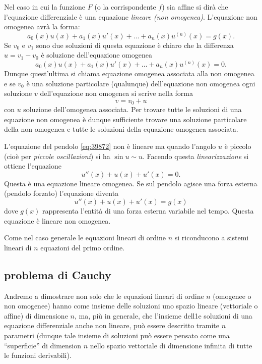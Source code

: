 Nel caso in cui la funzione $F$ (o la corrispondente $f$)
sia affine 
si dirà che l'equazione differenziale
è una equazione
%
%
\emph{lineare (non omogenea)}.
L'equazione non omogenea avrà la forma:
\[
  a_0(x) u(x) + a_1(x) u'(x) + \dots + a_n(x) u^{(n)}(x) = g(x).
\]
Se $v_0$ e $v_1$ sono due soluzioni di questa equazione è chiaro che la
differenza $u=v_1 - v_0$ è soluzione dell'equazione omogenea
\[
  a_0(x) u(x) + a_1(x) u'(x) + \dots + a_n(x) u^{(n)}(x) = 0.
\]
Dunque quest'ultima si chiama equazione omogenea associata alla non omogenea
e se $v_0$ è una soluzione particolare (qualunque) dell'equazione non omogenea
ogni soluzione $v$ dell'equazione non omogenea si scrive nella forma
\[
  v = v_0 + u
\]
con $u$ soluzione dell'omogenea associata.
Per trovare tutte le soluzioni di una equazione non omogenea è dunque
sufficiente trovare una soluzione particolare della non omogenea 
e tutte le soluzioni della equazione omogenea associata.

L'equazione del pendolo \eqref{eq:39872} non è lineare
ma quando l'angolo $u$ è piccolo (cioè per \emph{piccole oscillazioni}) si ha $\sin u \sim u$.
Facendo questa \emph{linearizzazione} si ottiene l'equazione
\[
  u''(x)  + u(x) + u'(x) = 0.
\]
Questa è una equazione lineare omogenea.
Se sul pendolo agisce una forza esterna (pendolo forzato) l'equazione diventa
\[
  u''(x) + u(x) + u'(x) = g(x)
\]
dove $g(x)$ rappresenta l'entità di una forza esterna variabile nel tempo.
Questa equazione è lineare non omogenea.

Come nel caso generale le equazioni lineari di ordine $n$ si riconducono
a sistemi lineari di $n$ equazioni del primo ordine.

\subsection{problema di Cauchy}

Andremo a dimostrare non solo che le equazioni lineari di ordine $n$ (omogenee o non omogenee) 
hanno come insieme 
delle soluzioni uno spazio lineare (vettoriale o affine) di dimensione $n$, 
ma, più in generale, che l'insieme dell1e soluzioni di una equazione differenziale 
anche non lineare, può essere descritto tramite $n$ parametri
(dunque tale insieme di soluzioni può essere pensato come una ``superficie'' 
di dimension $n$ nello spazio vettoriale di dimensione infinita 
di tutte le funzioni derivabili).

